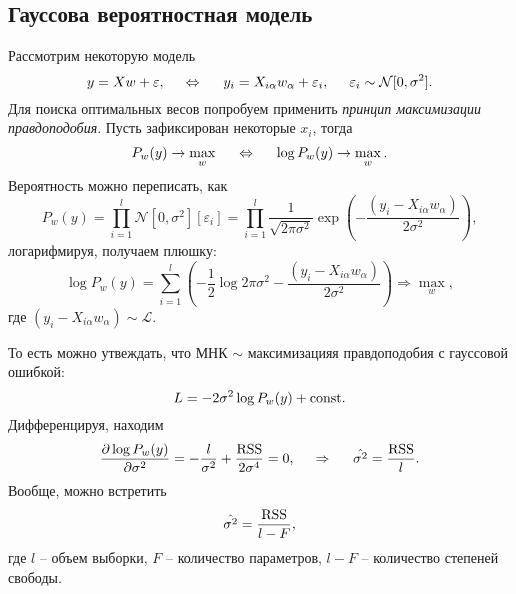 \subsection{Гауссова вероятностная модель}

Рассмотрим некоторую модель
\begin{equation*}
    y = X w + \varepsilon, 
    \hspace{0.5cm} \Leftrightarrow \hspace{0.5cm}
    y_i = X_{i \alpha} w_\alpha + \varepsilon_i,
    \hspace{5 mm} 
    \varepsilon_i \sim \mathcal N[0, \sigma^2].
\end{equation*}
Для поиска оптимальных весов попробуем применить \textit{принцип максимизации правдоподобия}. Пусть зафиксирован некоторые $x_i$, тогда
\begin{equation*}
    P_w (y) \to \max_w
    \hspace{0.5cm} \Leftrightarrow \hspace{0.5cm}
    \log P_w (y) \to \max_w.
\end{equation*}
Вероятность можно переписать, как
\begin{equation*}
    P_w (y) = \prod_{i=1}^l \mathcal N [0, \sigma^2] [\varepsilon_i] = \prod_{i=1}^{l} \frac{1}{\sqrt{2 \pi \sigma^2}} \exp\left(
        - \frac{(y_i - X_{i \alpha} w_\alpha)}{2 \sigma^2}
    \right),
\end{equation*}
логарифмируя, получаем плюшку:
\begin{equation*}
    \log P_w (y) = \sum_{i=1}^l \left(
        - \frac{1}{2} \log 2 \pi \sigma^2 - 
        \frac{(y_i - X_{i \alpha} w_\alpha)}{2 \sigma^2}
    \right) \Longrightarrow \max_w,
\end{equation*}
где $(y_i - X_{i \alpha} w_\alpha) \sim \mathcal L$. 

То есть можно утвеждать, что МНК $\sim$ максимизацияя правдоподобия с гауссовой ошибкой:
\begin{equation*}
    L = - 2 \sigma^2 \log P_w (y) + \textnormal{const}.
\end{equation*}
Дифференцируя, находим
\begin{equation*}
    \frac{\partial \log P_w (y)}{\partial \sigma^2} = - \frac{l}{\sigma^2} + \frac{\mathrm{RSS}}{2 \sigma^4} = 0,
    \hspace{0.5cm} \Rightarrow \hspace{0.5cm}
    \hat{\sigma^2} = \frac{\textnormal{RSS}}{l}.
\end{equation*}
Вообще, можно встретить
\begin{equation*}
    \hat{\sigma^2} = \frac{\textnormal{RSS}}{l-F},
\end{equation*}
где $l$ -- объем выборки, $F$ -- количество параметров, $l-F$ -- количество степеней свободы. 



